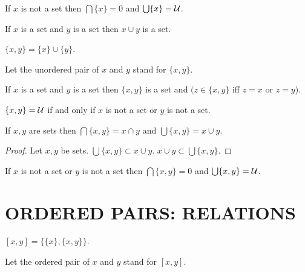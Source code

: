 \documentclass[a4paper,draft]{amsproc}
\begin{document}
\begin{forthel}
\begin{theorem}
If $x$ is not a set then $\bigcap \{x\} = 0$
and $\bigcup \{x\} = \cal{U}$.
\end{theorem}

\begin{axiom}
If $x$ is a set and $y$ is a set then $x \cup y$ is a set.
\end{axiom}

\begin{definition} $\{x,y\} = \{x\} \cup \{y\}$.\end{definition}
Let the unordered pair of $x$ and $y$ stand for $\{x,y\}$.


\begin{theorem}
If $x$ is a set and $y$ is a set 
then $\{x,y\}$ is a set and $(z \in \{x,y\}$ iff $z=x$ or $z=y$). 
\end{theorem}

\begin{theorem}
$\{x,y\} = \cal{U}$ if and only if $x$ is not a set or $y$ is not a set.
\end{theorem}

\begin{theorem}
If $x,y$ are sets then $\bigcap \{x,y\} = x \cap y$
and $\bigcup \{x,y\} = x \cup y$.
\end{theorem}
\begin{proof}
Let $x,y$ be sets.
$\bigcup \{x,y\} \subset x \cup y$.
$x \cup y \subset \bigcup \{x,y\}$.
\end{proof}

\begin{theorem}
If $x$ is not a set or $y$ is not a set then
$\bigcap \{x,y\} = 0$ and $\bigcup \{x,y\} = \cal{U}$.
\end{theorem}

\section{ORDERED PAIRS: RELATIONS}

\begin{definition} $[x,y] = \{\{x\},\{x,y\}\}$.\end{definition}
Let the ordered pair of $x$ and $y$ stand for $[x,y]$.


\end{forthel}
\end{document}
